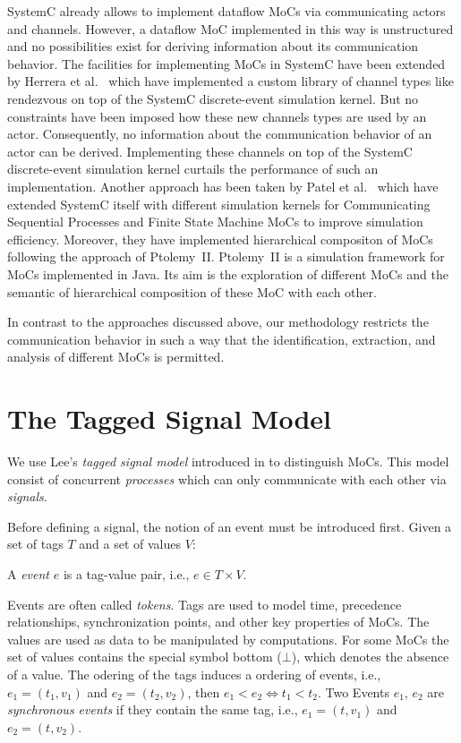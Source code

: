 SystemC \cite{glms:2002} already allows to implement
dataflow MoCs via communicating actors and  channels.
However, a dataflow MoC implemented in this way is unstructured
and no possibilities exist for deriving information about its
communication behavior. The facilities for implementing MoCs in
SystemC have been extended by Herrera et al.~\cite{herrerasystemc:2004}
which have implemented a custom library of channel types like rendezvous
on top of the SystemC discrete-event simulation kernel. But no
constraints have been imposed how these new channels types are used by
an actor. Consequently, no information about the communication
behavior of an actor can be derived.
Implementing these channels on top of the SystemC discrete-event
simulation kernel curtails the performance of such an implementation.
Another approach has been taken by Patel et al.~\cite{fermatmoc:2004}
which have extended SystemC itself with different simulation kernels
for Communicating Sequential Processes and Finite State Machine MoCs
to improve simulation efficiency. Moreover,
they have implemented hierarchical compositon of MoCs following
the approach of \hbox{Ptolemy II}. \hbox{Ptolemy II} \cite{ptolemyII} is a simulation
framework for MoCs implemented in Java. Its aim is the exploration of
different MoCs and the semantic of hierarchical composition of these MoC
with each other.

In contrast to the approaches discussed above, our methodology restricts
the communication behavior in such a way that the identification,
extraction, and analysis of different MoCs is permitted.

\section{The Tagged Signal Model}\label{lee-tsm}

We use Lee's \emph{tagged signal model} introduced in \cite{Lee98} to
distinguish MoCs. This model consist of concurrent \emph{processes} which
can only communicate with each other via \emph{signals}.

Before defining a signal, the notion of an event must be introduced first.
Given a set of tags $T$ and a set of values $V$:
\begin{sdefinition}
A \emph{event} $e$ is a  tag-value pair, i.e., $e \in T \times V$.
\end{sdefinition}
Events are often called \emph{tokens}. Tags are used to model time,
precedence relationships, synchronization points, and other key properties
of MoCs. The values are used as data to be manipulated by computations.
For some MoCs the set of values contains the special symbol bottom ($\bot$),
which denotes the absence of a value. The odering of the tags induces
a ordering of events, i.e., $e_1 = (t_1,v_1)$ and $e_2 = (t_2,v_2)$, then $e_1 < e_2 \iff t_1 < t_2$.
Two Events $e_1$, $e_2$ are \emph{synchronous events} if they contain
the same tag, i.e., $e_1 = (t,v_1)$ and $e_2 = (t,v_2)$.

